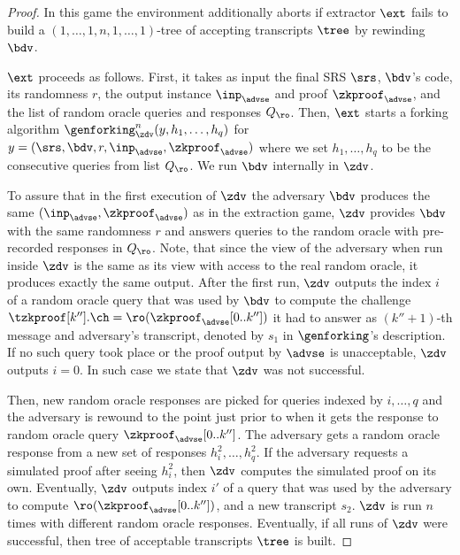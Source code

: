 \begin{proof}
	In this game the environment additionally aborts if extractor $\ext$ fails to build a
	$(1, \ldots, 1, n, 1, \ldots, 1)$-tree of accepting transcripts $\tree$ by rewinding
	$\bdv$.
	
	$\ext$ proceeds as follows. First, it takes as input the final SRS $\srs$,
	$\bdv$'s code, its randomness $r$, the output instance $\inp_{\advse}$ and proof
	$\zkproof_{\advse}$, and the list of random oracle queries and responses
	$Q_\ro$. Then, $\ext$ starts a forking algorithm
	$\genforking^{n}_\zdv(y,h_1, \ldots, h_q)$ for
	$y = (\srs, \bdv, r, \inp_{\advse}, \zkproof_{\advse})$ where we set
	$h_1, \ldots, h_q$ to be the consecutive queries from list $Q_\ro$. We run $\bdv$
	internally in $\zdv$. 
	
	To assure that in the first execution of $\zdv$ the adversary $\bdv$ produces the
	same $(\inp_{\advse}, \zkproof_{\advse})$ as in the extraction game, $\zdv$ provides
	$\bdv$ with the same randomness $r$ and answers queries to the random oracle with
	pre-recorded responses in $Q_\ro$.
	Note, that since the view of the adversary when run inside $\zdv$ is the same as its
	view with access to the real random oracle, it produces exactly the same
	output. After the first run, $\zdv$ outputs the index $i$ of a random oracle query
	that was used by $\bdv$ to compute the challenge
	$\tzkproof[k''].\ch = \ro(\zkproof_{\advse}[0..k''])$ it had to answer as
	$(k'' + 1)$-th message and adversary's transcript, denoted by $s_1$ in
	$\genforking$'s description. If no such query took place or the proof output by
	$\advse$ is unacceptable, $\zdv$ outputs $i = 0$. In such case we state that $\zdv$
	was not successful.
	
	Then, new random oracle responses are picked for queries indexed by $i, \ldots, q$
	and the adversary is rewound to the point just prior to when it gets the response to
	random oracle query $\zkproof_{\advse}[0..k'']$. The adversary gets a random oracle response from
	a new set of responses $h^2_i, \ldots, h^2_q$. If the adversary requests a simulated
	proof after seeing $h^2_i$, then $\zdv$ computes the simulated proof on its
	own. Eventually, $\zdv$ outputs index $i'$ of a query that was used by the adversary
	to compute $\ro(\zkproof_{\advse}[0..k''])$, and a new transcript $s_2$. $\zdv$ is run
	$n$ times with different random oracle responses.  Eventually, if all runs of $\zdv$
	were successful, then tree of acceptable transcripts $\tree$ is built.
	

\end{proof}
